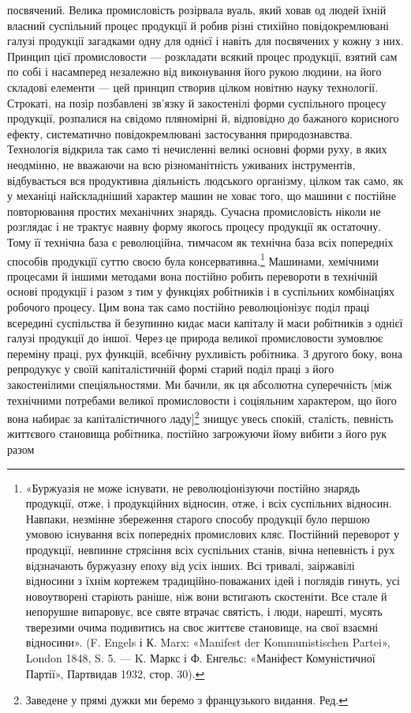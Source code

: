 посвячений. Велика промисловість розірвала вуаль, який ховав
од людей їхній власний суспільний процес продукції й робив
різні стихійно повідокремлювані галузі продукції загадками
одну для однієї і навіть для посвячених у кожну з них. Принцип
цієї промисловости — розкладати всякий процес продукції, взятий
сам по собі і насамперед незалежно від виконування його
рукою людини, на його складові елементи — цей принцип створив
цілком новітню науку технології. Строкаті, на позір позбавлені
зв’язку й закостенілі форми суспільного процесу продукції,
розпалися на свідомо пляномірні й, відповідно до бажаного корисного
ефекту, систематично повідокремлювані застосування
природознавства. Технологія відкрила так само ті нечисленні
великі основні форми руху, в яких неодмінно, не вважаючи на
всю різноманітність уживаних інструментів, відбувається вся
продуктивна діяльність людського організму, цілком так само,
як у механіці найскладніший характер машин не ховає того,
що машини є постійне повторювання простих механічних знарядь.
Сучасна промисловість ніколи не розглядає і не трактує наявну
форму якогось процесу продукції як остаточну. Тому її технічна
база є революційна, тимчасом як технічна база всіх попередніх
способів продукції суттю своєю була консервативна.\footnote{
«Буржуазія не може існувати, не революціонізуючи постійно
знарядь продукції, отже, і продукційних відносин, отже, і всіх суспільних
відносин. Навпаки, незмінне збереження старого способу продукції було
першою умовою існування всіх попередніх промислових кляс. Постійний
переворот у продукції, невпинне стрясіння всіх суспільних станів, вічна
непевність і рух відзначають буржуазну епоху від усіх інших. Всі тривалі,
заіржавілі відносини з їхнім кортежем традиційно-поважаних ідей і
поглядів гинуть, усі новоутворені старіють раніше, ніж вони встигають
скостеніти. Все стале й непорушне випаровує, все святе втрачає святість,
і люди, нарешті, мусять тверезими очима подивитись на своє життєве
становище, на свої взаємні відносини». (F. Engels і К. Marx: «Manifest
der Kommunistischen Partei», London 1848, S. 5. — K. Маркс
і Ф. Енгельс: «Маніфест Комуністичної Партії», Партвидав 1932, стор. 30).
} Машинами,
хемічними процесами й іншими методами вона постійно
робить перевороти в технічній основі продукції і разом з тим
у функціях робітників і в суспільних комбінаціях робочого процесу.
Цим вона так само постійно революціонізує поділ праці
всередині суспільства й безупинно кидає маси капіталу й маси
робітників з однієї галузі продукції до іншої. Через це природа
великої промисловости зумовлює переміну праці, рух функцій,
всебічну рухливість робітника. З другого боку, вона репродукує
у своїй капіталістичній формі старий поділ праці з його закостенілими
спеціяльностями. Ми бачили, як ця абсолютна суперечність
[між технічними потребами великої промисловости і соціяльним
характером, що його вона набирає за капіталістичного ладу]\footnote*{
Заведене у прямі дужки ми беремо з французького видання. Ред.
}
знищує увесь спокій, сталість, певність життєвого становища
робітника, постійно загрожуючи йому вибити з його рук разом